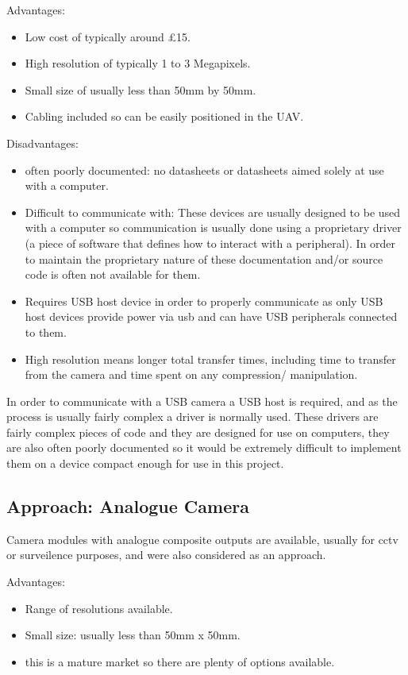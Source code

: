 Advantages:
      \begin{itemize}
         \item Low cost of typically around \pounds 15.
         \item High resolution of typically 1 to 3 Megapixels.
		 \item Small size of usually less than 50mm by 50mm.
		 \item Cabling included so can be easily positioned in the UAV.
     \end{itemize}

Disadvantages:
\begin{itemize}
     \item often poorly documented: no datasheets or datasheets aimed solely at use with a computer.
     \item Difficult to communicate with: These devices are usually designed to be used with a computer so communication is usually done using a proprietary driver (a piece of software that defines how to interact with a peripheral). In order to maintain the proprietary nature of these documentation and/or source code is often not available for them.
    \item Requires USB host device in order to properly communicate as only USB host devices provide power via usb and can have USB peripherals connected to them.
	\item High resolution means longer total transfer times, including time to transfer from the camera and time spent on any compression/ manipulation.
\end{itemize}

In order to communicate with a USB camera a USB host is required, and as the process is usually fairly complex a driver is normally used. These drivers are fairly complex pieces of code and they are designed for use on computers, they are also often poorly documented so it would be extremely difficult to implement them on a device compact enough for use in this project.

\subsection{Approach: Analogue Camera}
\label{sec:Analog_option}

Camera modules with analogue composite outputs are available, usually for cctv or surveilence purposes, and were also considered as an approach.

Advantages:
\begin{itemize}
	\item Range of resolutions available.
	\item Small size: usually less than 50mm x 50mm.
	\item this is a mature market so there are plenty of options available.
\end{itemize}

